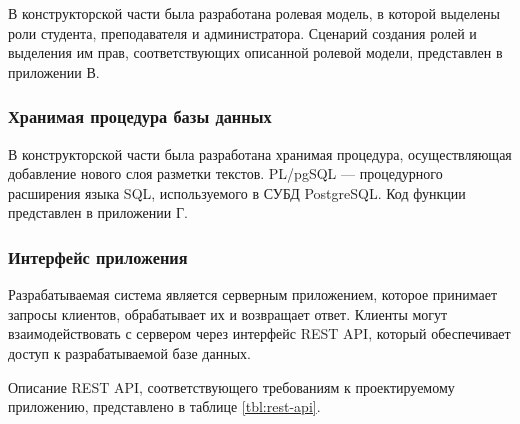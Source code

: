 
В конструкторской части была разработана ролевая модель, в которой выделены роли студента, преподавателя и администратора. Сценарий создания ролей и выделения им прав, соответствующих описанной ролевой модели, представлен в приложении В.


\subsubsection{Хранимая процедура базы данных}


В конструкторской части была разработана хранимая процедура, осуществляющая добавление нового слоя разметки текстов. PL/pgSQL \cite{plpgsql} --- процедурного расширения языка SQL, используемого в СУБД PostgreSQL. Код функции представлен в приложении Г.

\subsubsection{Интерфейс приложения}


Разрабатываемая система является серверным приложением, которое принимает запросы клиентов, обрабатывает их и возвращает ответ. Клиенты могут взаимодействовать с сервером через интерфейс REST API, который обеспечивает доступ к разрабатываемой базе данных. 


Описание REST API, соответствующего требованиям к проектируемому приложению, представлено в таблице \ref{tbl:rest-api}.

